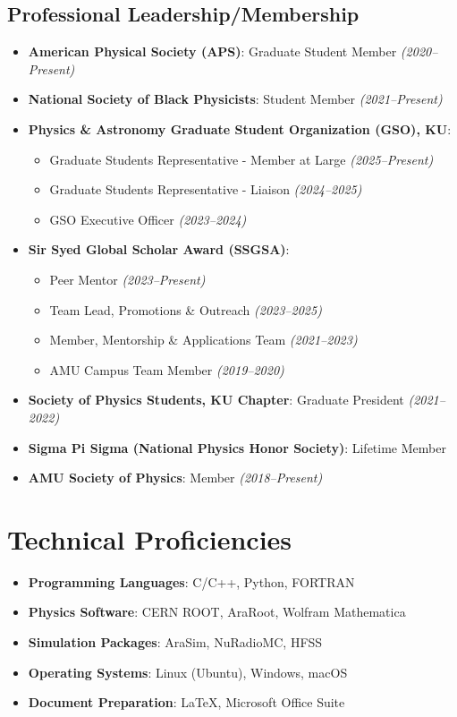 \documentclass[10pt]{report}
\begin{document}
\subsection*{Professional Leadership/Membership}
\begin{itemize}
    \item \textbf{American Physical Society (APS)}: Graduate Student Member  
    \textit{(2020--Present)}
    \item \textbf{National Society of Black Physicists}: Student Member \textit{(2021--Present)}
    \item \textbf{Physics \& Astronomy Graduate Student Organization (GSO), KU}:
    \begin{itemize}[label={\color{black}$\checkmark$}]
        \item Graduate Students Representative - Member at Large  \textit{(2025--Present)}
        \item Graduate Students Representative - Liaison  \textit{(2024--2025)}
        \item GSO Executive Officer  \textit{(2023--2024)}
    \end{itemize}%
    \item \textbf{Sir Syed Global Scholar Award (SSGSA)}:
    \begin{itemize}[label={\color{black}$\checkmark$}]
        \item Peer Mentor \textit{(2023--Present)}
        \item Team Lead, Promotions \& Outreach \textit{(2023--2025)}
        \item Member, Mentorship \& Applications Team \textit{(2021--2023)}
        \item AMU Campus Team Member \textit{(2019--2020)}
    \end{itemize}
    \item \textbf{Society of Physics Students, KU Chapter}: Graduate President \textit{(2021--2022)}
    \item \textbf{Sigma Pi Sigma (National Physics Honor Society)}: Lifetime Member
    \item \textbf{AMU Society of Physics}: Member \textit{(2018--Present)}
\end{itemize}

\section*{Technical Proficiencies}
\begin{itemize}
    \item \textbf{Programming Languages}: C/C++, Python, FORTRAN
    \item \textbf{Physics Software}: CERN ROOT, AraRoot, Wolfram Mathematica
    \item \textbf{Simulation Packages}: AraSim, NuRadioMC, HFSS
    \item \textbf{Operating Systems}: Linux (Ubuntu), Windows, macOS
    \item \textbf{Document Preparation}: \LaTeX, Microsoft Office Suite
\end{itemize}
\end{document}
